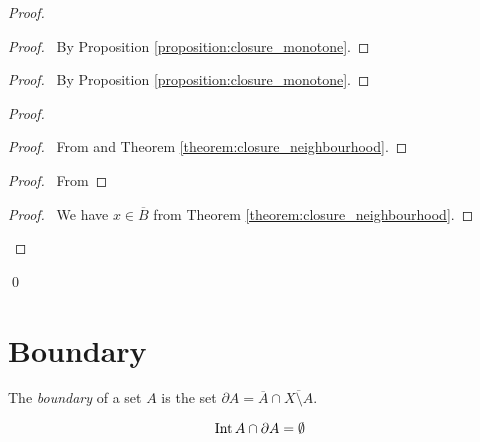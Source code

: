 \begin{proof}
    \pf
    \begin{proof}
        \pf\ By Proposition \ref{proposition:closure_monotone}.
    \end{proof}
    \begin{proof}
        \pf\ By Proposition \ref{proposition:closure_monotone}.
    \end{proof}
    \begin{proof}
        \begin{proof}
            \pf\ From  and Theorem \ref{theorem:closure_neighbourhood}.
        \end{proof}
        \begin{proof}
            \pf\ From 
        \end{proof}
        \qedstep
        \begin{proof}
            \pf\ We have $x \in \overline{B}$ from Theorem \ref{theorem:closure_neighbourhood}.
        \end{proof}
    \end{proof}
    \qed
\end{proof}

\section{Boundary}

\begin{definition}[Boundary]
    The \emph{boundary} of a set $A$ is the set $\partial A = \overline{A} \cap \overline{X \setminus A}$.
\end{definition}

\begin{proposition}
    \label{proposition:int_partial_disjoint}
    \[ \operatorname{Int} A \cap \partial A = \emptyset \]
\end{proposition}


